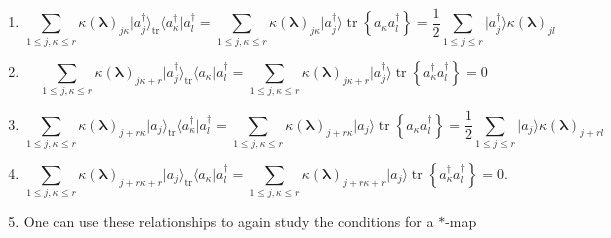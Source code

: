 \documentclass[aps, preprint]{revtex4}
\begin{document}
\begin{enumerate}
\item
\begin{equation}\sum _{1 \leq j ,\kappa  \leq r}\kappa  \left (\mathbf{\lambda }\right )_{j \kappa } \vert a_{j}^{ \dag } \rangle _{\ensuremath{\operatorname*{tr}}} \langle a_{\kappa }^{ \dag }\vert a_{l}^{ \dag } =\sum _{1 \leq j ,\kappa  \leq r}\kappa  \left (\mathbf{\lambda }\right )_{j \kappa }\vert a_{j}^{ \dag } \rangle \ensuremath{\operatorname*{tr}} \left \{a_{\kappa } a_{l}^{ \dag }\right \} =\frac{1}{2} \sum _{1 \leq j \leq r}\vert a_{j}^{ \dag } \rangle  \kappa  \left (\mathbf{\lambda }\right )_{j l}
\end{equation}

\item
\begin{equation}\sum _{1 \leq j ,\kappa  \leq r}\kappa  \left (\mathbf{\lambda }\right )_{j \kappa  +r} \vert a_{j}^{ \dag } \rangle _{\ensuremath{\operatorname*{tr}}} \langle a_{\kappa }\vert a_{l}^{ \dag } =\sum _{1 \leq j ,\kappa  \leq r}\kappa  \left (\mathbf{\lambda }\right )_{j \kappa  +r}\vert a_{j}^{ \dag } \rangle \ensuremath{\operatorname*{tr}} \left \{a_{\kappa }^{ \dag } a_{l}^{ \dag }\right \} =0
\end{equation}

\item
\begin{equation}\sum _{1 \leq j ,\kappa  \leq r}\kappa  \left (\mathbf{\lambda }\right )_{j +r \kappa } \vert a_{j} \rangle _{\ensuremath{\operatorname*{tr}}} \langle a_{\kappa }^{ \dag }\vert a_{l}^{ \dag } =\sum _{1 \leq j ,\kappa  \leq r}\kappa  \left (\mathbf{\lambda }\right )_{j +r \kappa }\vert a_{j} \rangle \ensuremath{\operatorname*{tr}} \left \{a_{\kappa } a_{l}^{ \dag }\right \} =\frac{1}{2} \sum _{1 \leq j \leq r}\vert a_{j} \rangle  \kappa  \left (\mathbf{\lambda }\right )_{j +r l}
\end{equation}

\item
\begin{equation}\sum _{1 \leq j ,\kappa  \leq r}\kappa  \left (\mathbf{\lambda }\right )_{j +r \kappa  +r} \vert a_{j} \rangle _{\ensuremath{\operatorname*{tr}}} \langle a_{\kappa }\vert a_{l}^{ \dag } =\sum _{1 \leq j ,\kappa  \leq r}\kappa  \left (\mathbf{\lambda }\right )_{j +r \kappa  +r}\vert a_{j} \rangle \ensuremath{\operatorname*{tr}} \left \{a_{\kappa }^{ \dag } a_{l}^{ \dag }\right \} =0.
\end{equation}

\item One can use these relationships to again study the conditions
for a $ \ast $-map \end{enumerate}
\end{document}
